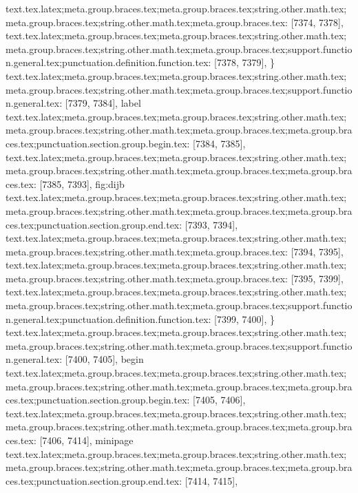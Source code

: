 {{{{{{{{{{{{{{{{{{{{{{{{{{{{{{{{{{{{{{{{{{{{{{{{{{{{{{{{{{{{{{{{{{{{{{{{{{{{{{{{{{{{{{{{{{{{{{{{{{{{{{{{{{{{{{{{{{{{{{{{{{{{{{{{{{{{{{{{{{{{{{{{{{{{{{{{{{{{{{{{{{{{{{{{{{{{{{{{{{{{{{{{{{{{{{{{{{{{{{{}
text.tex.latex;meta.group.braces.tex;meta.group.braces.tex;string.other.math.tex;meta.group.braces.tex;string.other.math.tex;meta.group.braces.tex: [7374, 7378], {    }
text.tex.latex;meta.group.braces.tex;meta.group.braces.tex;string.other.math.tex;meta.group.braces.tex;string.other.math.tex;meta.group.braces.tex;support.function.general.tex;punctuation.definition.function.tex: [7378, 7379], {\}
text.tex.latex;meta.group.braces.tex;meta.group.braces.tex;string.other.math.tex;meta.group.braces.tex;string.other.math.tex;meta.group.braces.tex;support.function.general.tex: [7379, 7384], {label}
text.tex.latex;meta.group.braces.tex;meta.group.braces.tex;string.other.math.tex;meta.group.braces.tex;string.other.math.tex;meta.group.braces.tex;meta.group.braces.tex;punctuation.section.group.begin.tex: [7384, 7385], {{}
text.tex.latex;meta.group.braces.tex;meta.group.braces.tex;string.other.math.tex;meta.group.braces.tex;string.other.math.tex;meta.group.braces.tex;meta.group.braces.tex: [7385, 7393], {fig:dijb}
text.tex.latex;meta.group.braces.tex;meta.group.braces.tex;string.other.math.tex;meta.group.braces.tex;string.other.math.tex;meta.group.braces.tex;meta.group.braces.tex;punctuation.section.group.end.tex: [7393, 7394], {}}
text.tex.latex;meta.group.braces.tex;meta.group.braces.tex;string.other.math.tex;meta.group.braces.tex;string.other.math.tex;meta.group.braces.tex: [7394, 7395], {
}
text.tex.latex;meta.group.braces.tex;meta.group.braces.tex;string.other.math.tex;meta.group.braces.tex;string.other.math.tex;meta.group.braces.tex: [7395, 7399], {    }
text.tex.latex;meta.group.braces.tex;meta.group.braces.tex;string.other.math.tex;meta.group.braces.tex;string.other.math.tex;meta.group.braces.tex;support.function.general.tex;punctuation.definition.function.tex: [7399, 7400], {\}
text.tex.latex;meta.group.braces.tex;meta.group.braces.tex;string.other.math.tex;meta.group.braces.tex;string.other.math.tex;meta.group.braces.tex;support.function.general.tex: [7400, 7405], {begin}
text.tex.latex;meta.group.braces.tex;meta.group.braces.tex;string.other.math.tex;meta.group.braces.tex;string.other.math.tex;meta.group.braces.tex;meta.group.braces.tex;punctuation.section.group.begin.tex: [7405, 7406], {{}
text.tex.latex;meta.group.braces.tex;meta.group.braces.tex;string.other.math.tex;meta.group.braces.tex;string.other.math.tex;meta.group.braces.tex;meta.group.braces.tex: [7406, 7414], {minipage}
text.tex.latex;meta.group.braces.tex;meta.group.braces.tex;string.other.math.tex;meta.group.braces.tex;string.other.math.tex;meta.group.braces.tex;meta.group.braces.tex;punctuation.section.group.end.tex: [7414, 7415], {}}
}}}}}}}}}}}}}}}}}}}}}}}}}}}}}}}}}}}}}}}}}}}}}}}}}}}}}}}}}}}}}}}}}}}}}}}}}}}}}}}}}}}}}}}}}}}}}}}}}}}}}}}}}}}}}}}}}}}}}}}}}}}}}}}}}}}}}}}}}}}}}}}}}}}}}}}}}}}}}}}}}}}}}}}}}}}}}}}}}}}}}}}}}}}}}}}}}}}}}}}}
